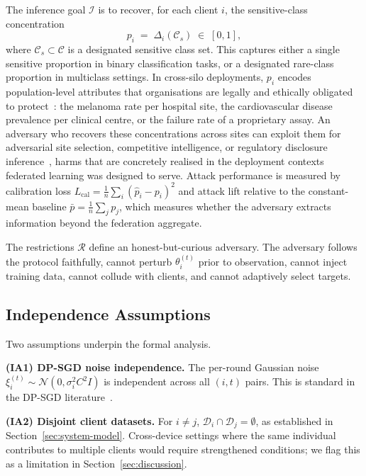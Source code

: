 \documentclass[letterpaper,journal]{IEEEtran}
\begin{document}
The inference goal $\mathcal{I}$ is to recover, for each client $i$,
the sensitive-class concentration
\[
p_i \;=\; \Delta_i(\mathcal{C}_s) \;\in\; [0,1],
\]
where $\mathcal{C}_s \subset \mathcal{C}$ is a designated sensitive
class set. This captures either a single sensitive proportion in
binary classification tasks, or a designated rare-class proportion in
multiclass settings. In cross-silo deployments, $p_i$ encodes population-level attributes
that organisations are legally and ethically obligated to
protect~\cite{sheller2020medicine,dayan2021covid}: the melanoma rate
per hospital site, the cardiovascular disease prevalence per clinical
centre, or the failure rate of a proprietary assay. An adversary who
recovers these concentrations across sites can exploit them for
adversarial site selection, competitive intelligence, or regulatory
disclosure inference~\cite{hu2021source}, harms that are concretely
realised in the deployment contexts federated learning was designed
to serve. Attack performance
is measured by calibration loss
$L_{\text{cal}} = \frac{1}{n}\sum_i (\hat{p}_i - p_i)^2$ and attack
lift relative to the constant-mean baseline
$\bar{p} = \frac{1}{n}\sum_j p_j$, which measures whether the
adversary extracts information beyond the federation aggregate.

The restrictions $\mathcal{R}$ define an honest-but-curious adversary.
The adversary follows the protocol faithfully, cannot perturb
$\theta_i^{(t)}$ prior to observation, cannot inject training data,
cannot collude with clients, and cannot adaptively select targets.

\subsection{Independence Assumptions}
\label{sec:independence}

\noindent Two assumptions underpin the formal analysis.\medskip

\noindent\textbf{(IA1) DP-SGD noise independence.} The per-round Gaussian noise
$\xi_i^{(t)} \sim \mathcal{N}(0, \sigma_i^2 C^2 I)$ is independent
across all $(i, t)$ pairs. This is standard in the DP-SGD
literature~\cite{abadi2016dpsgd}.\medskip

\noindent\textbf{(IA2) Disjoint client datasets.} For $i \neq j$,
$\mathcal{D}_i \cap \mathcal{D}_j = \emptyset$, as established in
Section~\ref{sec:system-model}. Cross-device settings where the same
individual contributes to multiple clients would require strengthened
conditions; we flag this as a limitation in
Section~\ref{sec:discussion}.\medskip
\end{document}
